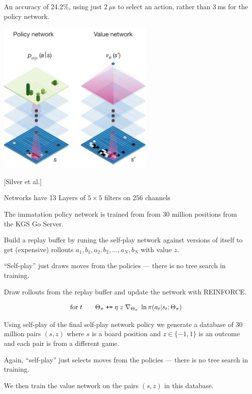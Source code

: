 {\vfill
An accuracy of 24.2\%, using just 2 $\mu$s to select an action, rather than 3 ms for the policy network.


\centerline{\includegraphics[height=3.0in]{../images/alphagoArchitecture2}}

\centerline{[Silver et al.]}

\vfill
Networks have 13 Layers of $5\times 5$ filters on 256 channels

\vfill
The immatation policy network is trained from from 30 million positions from the KGS Go Server.


Build a replay buffer by runing the self-play network against versions of itself to get (expensive) rollouts $a_1,b_1,a_2,b_2,\ldots,a_N,b_N$ with value $z$.

\vfill
``Self-play'' just draws moves from the policies --- there is no tree search in training.

\vfill
Draw rollouts from the replay buffer and update the network with REINFORCE.

$$\mathrm{for}\;t\;\;\;\;\;\;\;\Theta_\pi \;\mbox{\tt +=}\; \eta \;z\; \nabla_{\Theta_\pi} \;\ln \pi(a_t|s_t;\Theta_\pi)$$


Using self-play of the final self-play network policy we generate a database of 30 million pairs $(s,z)$ where $s$ is a board position and $z \in \{-1,1\}$ is an outcome
and each pair is from a different game.

\vfill
Again, ``self-play'' just selects moves from the policies --- there is no tree search in training.

\vfill
We then train the value network on the pairs $(s,z)$ in this database.

}
